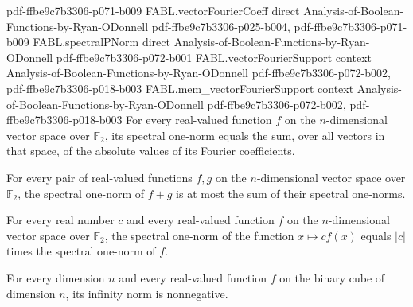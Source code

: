 \begin{theorem}
  {pdf-ffbe9c7b3306-p071-b009}
\proofstep
  {FABL.vectorFourierCoeff}
  {direct}
  {Analysis-of-Boolean-Functions-by-Ryan-ODonnell}
  {pdf-ffbe9c7b3306-p025-b004,
    pdf-ffbe9c7b3306-p071-b009}
\proofstep
  {FABL.spectralPNorm}
  {direct}
  {Analysis-of-Boolean-Functions-by-Ryan-ODonnell}
  {pdf-ffbe9c7b3306-p072-b001}
\proofstep
  {FABL.vectorFourierSupport}
  {context}
  {Analysis-of-Boolean-Functions-by-Ryan-ODonnell}
  {pdf-ffbe9c7b3306-p072-b002,
    pdf-ffbe9c7b3306-p018-b003}
\proofstep
  {FABL.mem_vectorFourierSupport}
  {context}
  {Analysis-of-Boolean-Functions-by-Ryan-ODonnell}
  {pdf-ffbe9c7b3306-p072-b002,
    pdf-ffbe9c7b3306-p018-b003}
For every real-valued function $f$ on the $n$-dimensional vector space over $\mathbb{F}_2$,
its spectral one-norm equals the sum, over all vectors in that space, of the absolute
values of its Fourier coefficients.
\end{theorem}

\begin{theorem}
\label{FABL.spectralPNorm_one_add_le}
\leanok
{}
For every pair of real-valued functions $f,g$ on the $n$-dimensional vector space over
$\mathbb{F}_2$, the spectral one-norm of $f+g$ is at most the sum of their spectral
one-norms.
\end{theorem}

\begin{theorem}
\label{FABL.spectralPNorm_one_const_mul}
\leanok
{}
For every real number $c$ and every real-valued function $f$ on the $n$-dimensional
vector space over $\mathbb{F}_2$, the spectral one-norm of the function $x\mapsto c f(x)$
equals $|c|$ times the spectral one-norm of $f$.
\end{theorem}

\begin{theorem}
\label{FABL.binaryFunctionInfinityNorm_nonneg}
\leanok
{}
For every dimension $n$ and every real-valued function $f$ on the binary cube of
dimension $n$, its infinity norm is nonnegative.
\end{theorem}
